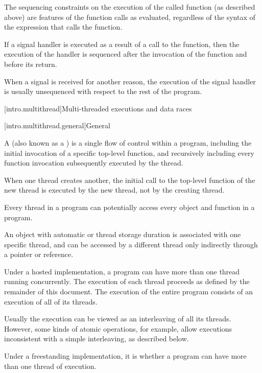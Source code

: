 \pnum
The sequencing constraints on the execution of the called function (as
described above) are features of the function calls as evaluated,
regardless of the syntax of the expression that calls the function.%
%

%
%
\pnum
If a signal handler is executed as a result of a call to the 
function, then the execution of the handler is sequenced after the invocation
of the  function and before its return.
\begin{note}
When a signal is received for another reason, the execution of the
signal handler is usually unsequenced with respect to the rest of the program.
\end{note}

[intro.multithread]{Multi-threaded executions and data races}

[intro.multithread.general]{General}

\pnum
{}%
%
A  (also known as a ) is a single flow of
control within a program, including the initial invocation of a specific
top-level function, and recursively including every function invocation
subsequently executed by the thread.
\begin{note}
When one thread creates another,
the initial call to the top-level function of the new thread is executed by the
new thread, not by the creating thread.
\end{note}
Every thread in a program can
potentially access every object and function in a program.
\begin{footnote}
An object
with automatic or thread storage duration is associated with
one specific thread, and can be accessed by a different thread only indirectly
through a pointer or reference.
\end{footnote}
Under a hosted
implementation, a \Cpp{} program can have more than one thread running
concurrently. The execution of each thread proceeds as defined by the remainder
of this document. The execution of the entire program consists of an execution
of all of its threads.
\begin{note}
Usually the execution can be viewed as an
interleaving of all its threads. However, some kinds of atomic operations, for
example, allow executions inconsistent with a simple interleaving, as described
below.
\end{note}
%
Under a freestanding implementation, it is  whether a program can
have more than one thread of execution.

